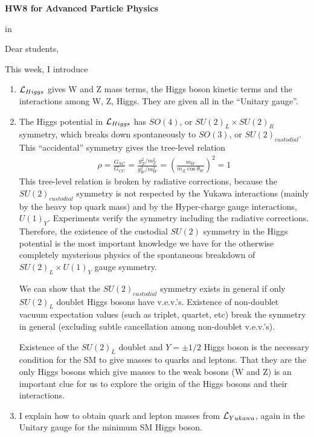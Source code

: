 \documentclass[12pt]{article}
\begin{document}
\begin{center}
{\large\bf HW8 for Advanced Particle Physics} \\

\end{center}

 in

Dear students,

This week, I introduce

\begin{enumerate}
  \item ${\cal L}_{Higgs}$ gives W and Z mass terms, the Higgs boson kinetic
  terms and the interactions among W, Z, Higgs.  They are
  given all in the ``Unitary gauge''.
  \item The Higgs potential in ${\cal L}_{Higgs}$ has $SO(4)$, or $SU(2)_L \times SU(2)_R$
  symmetry, which breaks down spontaneously to $SO(3)$, or $SU(2)_{custodial}$.
  This ``accidental'' symmetry gives the tree-level relation
  \begin{eqnarray}
    \rho =\frac{G_{NC}}{G_{CC}}=\frac{g_Z^2/m_Z^2}{g_W^2/m_W^2 }=\left (\frac{m_W}{m_Z\cos\theta_W} \right )^2=1
  \end{eqnarray}
  This tree-level relation is broken by radiative corrections, because
  the $SU(2)_{custodial}$ symmetry is not respected by the Yukawa interactions
  (mainly by the heavy top quark mass) and by the Hyper-charge gauge
  interactions, $U(1)_Y$.  Experiments verify the symmetry including the
  radiative corrections.  Therefore, the existence of the custodial
  $SU(2)$ symmetry in the Higgs potential is the most important knowledge
  we have for the otherwise completely mysterious physics of the
  spontaneous breakdown of $SU(2)_L \times U(1)_Y$ gauge symmetry.

  We can show that the $SU(2)_{custodial}$ symmetry exists in
  general if only $SU(2)_L$ doublet Higgs bosons have v.e.v.'s.
  Existence of non-doublet vacuum expectation values (such as
  triplet, quartet, etc) break the symmetry in general
  (excluding subtle cancellation among non-doublet v.e.v.'s).

  Existence of the $SU(2)_L$ doublet and $Y=\pm 1/2$ Higgs boson is the
  necessary condition for the SM to give masses to quarks and leptons.
  That they are the only Higgs bosons which give masses to the weak
  bosons (W and Z) is an important clue for us to explore the origin
  of the Higgs bosons and their interactions.

  \item I explain how to obtain quark and lepton masses from ${\cal L}_{Yukawa}$,
  again in the Unitary gauge for the minimum SM Higgs boson.


\end{enumerate}
\end{document}

